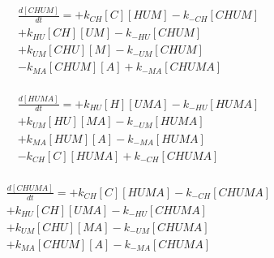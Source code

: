 \begin{equation}
\begin{split}
\frac{d[CHUM]}{dt} =  + k_{CH}[C][HUM]  - k_{-CH}[CHUM]   \\%
                      + k_{HU}[CH][UM]  - k_{-HU}[CHUM]   \\%
                      + k_{UM}[CHU][M]  - k_{-UM}[CHUM]   \\%
                      - k_{MA}[CHUM][A] + k_{-MA}[CHUMA]  \\%
\end{split}
\end{equation}

\begin{equation}
\begin{split}
\frac{d[HUMA]}{dt} =  + k_{HU}[H][UMA] - k_{-HU}[HUMA]    \\%
                      + k_{UM}[HU][MA] - k_{-UM}[HUMA]    \\%
                      + k_{MA}[HUM][A] - k_{-MA}[HUMA]    \\%
                      - k_{CH}[C][HUMA] + k_{-CH}[CHUMA]  \\%
\end{split}
\end{equation}

\begin{equation}
\begin{split}
\frac{d[CHUMA]}{dt} = + k_{CH}[C][HUMA] - k_{-CH}[CHUMA]  \\%
                      + k_{HU}[CH][UMA] - k_{-HU}[CHUMA]  \\%
                      + k_{UM}[CHU][MA] - k_{-UM}[CHUMA]  \\%
                      + k_{MA}[CHUM][A] - k_{-MA}[CHUMA]  \\%
\end{split}
\end{equation}

